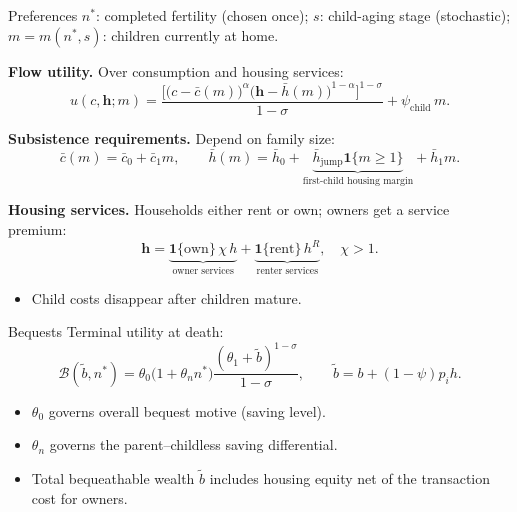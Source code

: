 \documentclass[11pt,aspectratio=169]{beamer}
\begin{document}
\begin{frame}{Preferences}
\small
$n^*$: completed fertility (chosen once); $s$: child-aging stage (stochastic); $m = m(n^*,s)$: children currently at home.

\medskip
\textbf{Flow utility.} Over consumption and housing services:
\[
u(c,\mathbf h;m)
= \frac{\Big[\big(c-\bar c(m)\big)^\alpha \big(\mathbf h-\bar h(m)\big)^{1-\alpha}\Big]^{1-\sigma}}{1-\sigma}
+ \psi_{\mathrm{child}}\,m.
\]

\textbf{Subsistence requirements.} Depend on family size:
\[
\bar c(m)=\bar c_0+\bar c_1 m,
\qquad
\bar h(m)=\bar h_0+\underbrace{\bar h_{\mathrm{jump}}\mathbf{1}\{m\geq 1\}}_{\text{first-child housing margin}}+\bar h_1 m.
\]

\textbf{Housing services.} Households either rent or own; owners get a service premium:
\[
\mathbf h = \underbrace{\mathbf{1}\{\text{own}\}\,\chi\, h}_{\text{owner services}} + \underbrace{\mathbf{1}\{\text{rent}\}\,h^R}_{\text{renter services}}, \quad \chi > 1.
\]

\begin{itemize}
  \item Child costs disappear after children mature.
\end{itemize}
\end{frame}

\begin{frame}{Bequests}
\small
Terminal utility at death:
\[
\mathcal B(\widetilde b,n^*)= \theta_0\big(1+\theta_n n^*\big)\frac{(\theta_1+\widetilde b)^{1-\sigma}}{1-\sigma},
\qquad
\widetilde b=b+(1-\psi)p_i h.
\]
\begin{itemize}
  \vfill \item $\theta_0$ governs overall bequest motive (saving level).
  \vfill \item $\theta_n$ governs the parent--childless saving differential.
  \vfill \item Total bequeathable wealth $\widetilde b$ includes housing equity net of the transaction cost for owners.
\end{itemize}
\end{frame}
\end{document}
